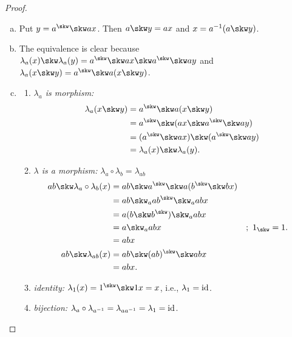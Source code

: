 \begin{proof}${}$
    \begin{enumerate}[a),font=\upshape]
        \item Put $y=a^\skw\skw ax$. Then $a\skw y= ax$ and $x=a^{-1}(a\skw y)$.
        \item The equivalence is clear because $\lambda_a(x)\skw \lambda_a(y)=a^\skw\skw ax\skw a^\skw\skw ay$ and $\lambda_a(x\skw y)= a^\skw\skw a(x\skw y)$. 
        
        \item
        \begin{enumerate}[-]
            \item \textit{$\lambda_a$ is morphism:}
                \begin{align*}
                    \lambda_a(x\skw y) &= a^\skw\skw a(x\skw y)\\
                        &= a^\skw\skw(ax\skw a^\skw\skw ay)\\
                        &= (a^\skw\skw ax)\skw(a^\skw\skw ay)\\
                        &= \lambda_a(x)\skw\lambda_a(y).
                \end{align*}
            \item \textit{$\lambda$ is a morphism:} $\lambda_a\circ\lambda_b=\lambda_{ab}$
                \begin{align*}
                    ab\skw\lambda_a\circ\lambda_b(x) &=
                            ab\skw a^\skw\skw a(b^\skw\skw bx)\\
                        &= ab\skw_a ab^\skw\skw_aabx\\
                        &= a(b\skw b^\skw)\skw_aabx\\
                        &= a\skw_aabx   &&;\ 1_{\skw}=1.\\
                        &= abx\\
                    ab\skw\lambda_{ab}(x) &= ab\skw (ab)^\skw\skw abx\\
                        &= abx.
                \end{align*}
            \item \textit{identity:} $\lambda_1(x)= 1^\skw\skw1x= x$, i.e., $\lambda_1=\operatorname{id}$.
            \item \textit{bijection:} $\lambda_a\circ\lambda_{a^{-1}}=\lambda_{aa^{-1}}=\lambda_1=\operatorname{id}$.
        \end{enumerate}
    \end{enumerate}
\end{proof}

